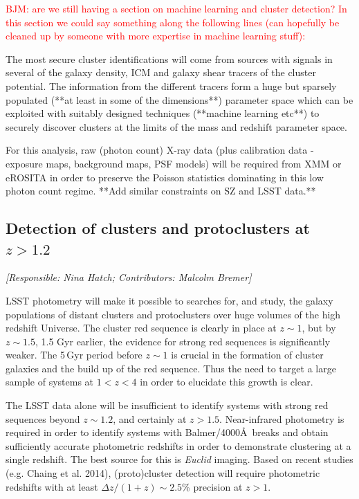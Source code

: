 \documentclass[a4paper,11pt]{article}
\newcommand{\red}{\textcolor{red}}
\begin{document}
\red{BJM: are we still having a section on machine learning and
  cluster detection? In this section we could say something along the
  following lines (can hopefully be cleaned up by someone with more
  expertise in machine learning stuff):}

The most secure cluster identifications will come from sources with
signals in several of the galaxy density, ICM and galaxy shear tracers
of the cluster potential. The information from the different tracers
form a huge but sparsely populated (**at least in some of the
dimensions**) parameter space which can be exploited with suitably
designed techniques (**machine learning etc**) to securely discover
clusters at the limits of the mass and redshift parameter space.

For this analysis, raw (photon count) X-ray data (plus calibration
data - exposure maps, background maps, PSF models) will be required
from XMM or eROSITA in order to preserve the Poisson statistics
dominating in this low photon count regime. **Add similar constraints
on SZ and LSST data.**
\subsection{Detection of clusters and protoclusters at $z>1.2$}\label{sec:proto}

{\it [Responsible: Nina Hatch; Contributors: Malcolm Bremer]}

\noindent LSST photometry will make it possible to searches for,
and study, the galaxy populations of distant clusters and
protoclusters over huge volumes of the high redshift Universe.  The cluster red sequence is clearly in
place at $z\sim 1$, but by $z\sim 1.5$, 1.5 Gyr earlier, the evidence for strong red
sequences is significantly weaker. The 5\,Gyr
period before $z\sim 1$ is crucial in the formation of cluster galaxies and the build up of
the red sequence. Thus the need to target a large sample of systems at $1<z< 4$ in order to
elucidate this growth is clear.

The LSST data alone will be insufficient to identify systems with strong
red sequences beyond $z\sim 1.2$, and certainly at $z>1.5$. 
Near-infrared photometry is required in order to identify
systems with Balmer/4000\AA\ breaks and obtain sufficiently accurate
photometric redshifts in order to demonstrate clustering at a single
redshift. The best source for this is \emph{Euclid} imaging.
 Based on recent studies (e.g. Chaing et al. 2014),
(proto)cluster detection will require photometric redshifts with at
least $\Delta z/ (1+z)\sim2.5$\% precision at $z>1$. 
\end{document}

